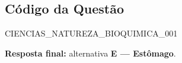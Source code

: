 \documentclass{article}
\begin{document}
\subsection*{Código da Questão}

CIENCIAS_NATUREZA_BIOQUIMICA_001

\bigskip

\noindent\textbf{Resposta final:} alternativa \textbf{E — Estômago}.
\end{document}
